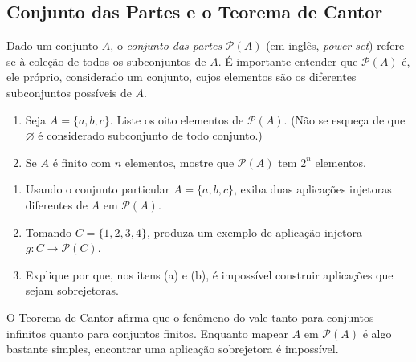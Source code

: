 \subsection{Conjunto das Partes e o Teorema de Cantor}\label{subsec:conjunto-partes}

 
\begin{definition}\label{def:conjunto-partes}
Dado um conjunto $A$, o \textit{conjunto das partes} $\mathcal{P}(A)$ (em inglês, \textit{power set}) refere-se à coleção de todos os subconjuntos de $A$. É importante entender que $\mathcal{P}(A)$ é, ele próprio, considerado um conjunto, cujos elementos são os diferentes subconjuntos possíveis de $A$.
\end{definition}

\begin{exercise}\label{ex:partes-abc}
\begin{enumerate}[label=\alph*)]
\item Seja $A = \{a, b, c\}$. Liste os oito elementos de $\mathcal{P}(A)$. (Não se esqueça de que $\varnothing$ é considerado subconjunto de todo conjunto.)
\item Se $A$ é finito com $n$ elementos, mostre que $\mathcal{P}(A)$ tem $2^{n}$ elementos.
\end{enumerate}
\end{exercise}

\begin{exercise}\label{ex:aplicacoes-injetoras-PA}
\begin{enumerate}[label=\alph*)]
\item Usando o conjunto particular $A = \{a, b, c\}$, exiba duas aplicações injetoras diferentes de $A$ em $\mathcal{P}(A)$.
\item Tomando $C = \{1, 2, 3, 4\}$, produza um exemplo de aplicação injetora $g \colon C \to \mathcal{P}(C)$.
\item Explique por que, nos itens (a) e (b), é impossível construir aplicações que sejam sobrejetoras.
\end{enumerate}
\end{exercise}

O Teorema de Cantor afirma que o fenômeno do  vale tanto para conjuntos infinitos quanto para conjuntos finitos. Enquanto mapear $A$ em $\mathcal{P}(A)$ é algo bastante simples, encontrar uma aplicação sobrejetora é impossível.

